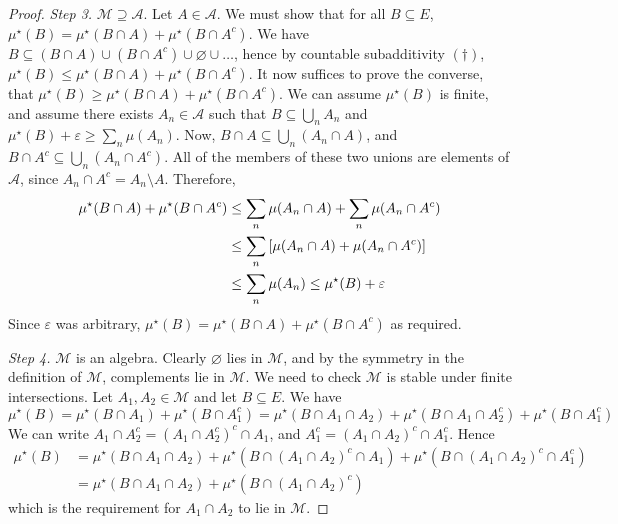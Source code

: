 \begin{proof}
	\emph{Step 3.} \( \mathcal M \supseteq \mathcal A \).
	Let \( A \in \mathcal A \).
	We must show that for all \( B \subseteq E \), \( \mu^\star(B) = \mu^\star(B \cap A) + \mu^\star(B \cap A^c) \).
	We have \( B \subseteq (B \cap A) \cup (B \cap A^c) \cup \varnothing \cup \dots \), hence by countable subadditivity \( (\dagger) \), \( \mu^\star(B) \leq \mu^\star(B \cap A) + \mu^\star(B \cap A^c) \).
	It now suffices to prove the converse, that \( \mu^\star(B) \geq \mu^\star(B \cap A) + \mu^\star(B \cap A^c) \).
	We can assume \( \mu^\star(B) \) is finite, and assume there exists \( A_n \in \mathcal A \) such that \( B \subseteq \bigcup_n A_n \) and \( \mu^\star(B) + \varepsilon \geq \sum_n \mu(A_n) \).
	Now, \( B \cap A \subseteq \bigcup_n (A_n \cap A) \), and \( B \cap A^c \subseteq \bigcup_n (A_n \cap A^c) \).
	All of the members of these two unions are elements of \( \mathcal A \), since \( A_n \cap A^c = A_n \setminus A \).
	Therefore,
	\begin{align*}
		\mu^\star(B \cap A) + \mu^\star(B \cap A^c) &\leq \sum_n \mu(A_n \cap A) + \sum_n \mu(A_n \cap A^c) \\
		&\leq \sum_n \qty[ \mu(A_n \cap A) + \mu(A_n \cap A^c) ] \\
		&\leq \sum_n \mu(A_n) \leq \mu^\star(B) + \varepsilon
	\end{align*}
	Since \( \varepsilon \) was arbitrary, \( \mu^\star(B) = \mu^\star(B \cap A) + \mu^\star(B \cap A^c) \) as required.

	\emph{Step 4.} \( \mathcal M \) is an algebra.
	Clearly \( \varnothing \) lies in \( \mathcal M \), and by the symmetry in the definition of \( \mathcal M \), complements lie in \( \mathcal M \).
	We need to check \( \mathcal M \) is stable under finite intersections.
	Let \( A_1, A_2 \in \mathcal M \) and let \( B \subseteq E \).
	We have
	\[ \mu^\star(B) = \mu^\star(B \cap A_1) + \mu^\star(B \cap A_1^c) = \mu^\star(B \cap A_1 \cap A_2) + \mu^\star(B \cap A_1 \cap A_2^c) + \mu^\star(B \cap A_1^c) \]
	We can write \( A_1 \cap A_2^c = (A_1 \cap A_2^c)^c \cap A_1 \), and \( A_1^c = (A_1 \cap A_2)^c \cap A_1^c \).
	Hence
	\begin{align*}
		\mu^\star(B) &= \mu^\star(B \cap A_1 \cap A_2) + \mu^\star(B \cap (A_1 \cap A_2)^c \cap A_1) + \mu^\star(B \cap (A_1 \cap A_2)^c \cap A_1^c) \\
		&= \mu^\star(B \cap A_1 \cap A_2) + \mu^\star(B \cap (A_1 \cap A_2)^c)
	\end{align*}
	which is the requirement for \( A_1 \cap A_2 \) to lie in \( \mathcal M \).


\end{proof}

